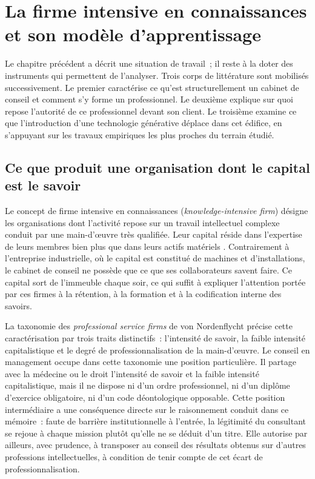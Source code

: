\section{La firme intensive en connaissances et son modèle d'apprentissage}

Le chapitre précédent a décrit une situation de travail~; il reste à la doter des
instruments qui permettent de l'analyser. Trois corps de littérature sont mobilisés
successivement. Le premier caractérise ce qu'est structurellement un cabinet de conseil et
comment s'y forme un professionnel. Le deuxième explique sur quoi repose l'autorité de ce
professionnel devant son client. Le troisième examine ce que l'introduction d'une
technologie générative déplace dans cet édifice, en s'appuyant sur les travaux empiriques
les plus proches du terrain étudié.

\subsection{Ce que produit une organisation dont le capital est le savoir}

Le concept de firme intensive en connaissances (\textit{knowledge-intensive firm}) désigne
les organisations dont l'activité repose sur un travail intellectuel complexe conduit par
une main-d'{\oe}uvre très qualifiée. Leur capital réside dans l'expertise de leurs membres
bien plus que dans leurs actifs matériels \cite{starbuck1992}. Contrairement à
l'entreprise industrielle, où le capital est constitué de machines et d'installations, le
cabinet de conseil ne possède que ce que ses collaborateurs savent faire. Ce capital sort
de l'immeuble chaque soir, ce qui suffit à expliquer l'attention portée par ces firmes à la
rétention, à la formation et à la codification interne des savoirs.

La taxonomie des \textit{professional service firms} de von Nordenflycht
\cite{nordenflycht2010} précise cette caractérisation par trois traits distinctifs~:
l'intensité de savoir, la faible intensité capitalistique et le degré de
professionnalisation de la main-d'{\oe}uvre. Le conseil en management occupe dans cette
taxonomie une position particulière. Il partage avec la médecine ou le droit l'intensité de
savoir et la faible intensité capitalistique, mais il ne dispose ni d'un ordre
professionnel, ni d'un diplôme d'exercice obligatoire, ni d'un code déontologique
opposable. Cette position intermédiaire a une conséquence directe sur le raisonnement
conduit dans ce mémoire~: faute de barrière institutionnelle à l'entrée, la légitimité du
consultant se rejoue à chaque mission plutôt qu'elle ne se déduit d'un titre. Elle autorise
par ailleurs, avec prudence, à transposer au conseil des résultats obtenus sur d'autres
professions intellectuelles, à condition de tenir compte de cet écart de
professionnalisation.

